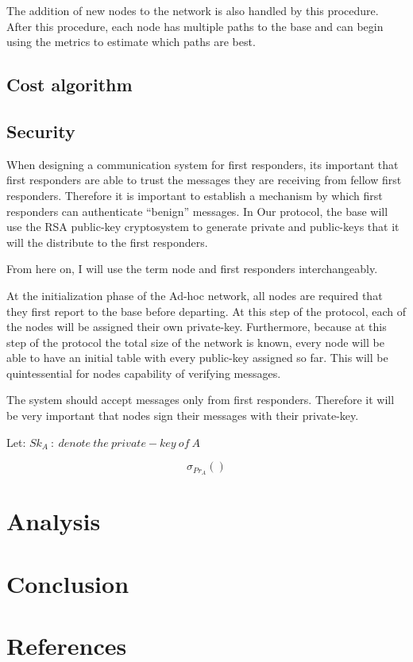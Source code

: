 \documentclass[letterpaper]{article}
\begin{document}
\noindent The addition of new nodes to the network is also handled by this procedure. After this procedure, 
each node has multiple paths to the base and can begin using the metrics to estimate which paths are best.


\subsection{Cost algorithm}

\subsection{Security}
When designing a communication system for first responders, its important that first responders are able to trust the messages they are receiving from fellow first responders. Therefore it is important to establish a mechanism by which first responders can authenticate “benign” messages. In Our protocol, the base will use the RSA public-key cryptosystem to generate private and public-keys that it will the distribute to the first responders.

From here on, I will use the term node and first responders interchangeably.

At the initialization phase of the Ad-hoc network, all nodes are required that they first report to the base before departing. At this step of the protocol, each of the nodes will be assigned their own private-key. Furthermore, because at this step of the protocol the total size of the network is known, every node will be able to have an initial table with every public-key assigned so far. This will be quintessential for nodes capability of verifying messages.

The system should accept messages only from first responders. Therefore it will be very important that nodes sign their messages with their private-key.

Let: $Sk_{A} \ : \ denote \ the \ private-key \ of\ A$

$$\sigma_{Pr_{A}}()$$

\section{Analysis}

\section{Conclusion}

\section{References}
\end{document}
